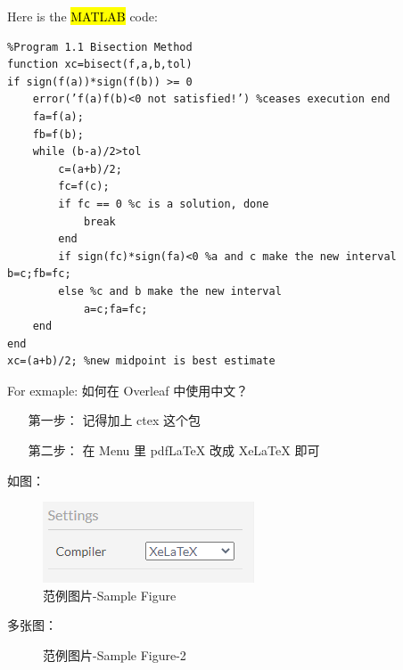 \documentclass[11pt]{article}
\theoremstyle{definition}
\begin{document}
Here is the \hl{MATLAB} code:
\begin{lstlisting}
%Program 1.1 Bisection Method
function xc=bisect(f,a,b,tol)
if sign(f(a))*sign(f(b)) >= 0
    error(’f(a)f(b)<0 not satisfied!’) %ceases execution end
    fa=f(a);
    fb=f(b);
    while (b-a)/2>tol
        c=(a+b)/2;
        fc=f(c);
        if fc == 0 %c is a solution, done
            break
        end
        if sign(fc)*sign(fa)<0 %a and c make the new interval b=c;fb=fc;
        else %c and b make the new interval
            a=c;fa=fc;
    end
end
xc=(a+b)/2; %new midpoint is best estimate
\end{lstlisting}
\begin{shaded}
For exmaple: 如何在 Overleaf 中使用中文？
\begin{itemize}
    \item[第一步：] 记得加上 ctex 这个包
    \item[第二步：] 在 Menu 里 pdfLaTeX 改成 XeLaTeX 即可
\end{itemize}
\end{shaded}
如图：
\begin{figure}[H]
    \centering
    \includegraphics{Capture.PNG}
    \caption{范例图片-Sample Figure}
    \label{fig:sam-fig-1-0}
\end{figure}
多张图：
\begin{figure}[H]
\centering
{}
\caption{范例图片-Sample Figure-2}
\end{figure}
\end{document}
